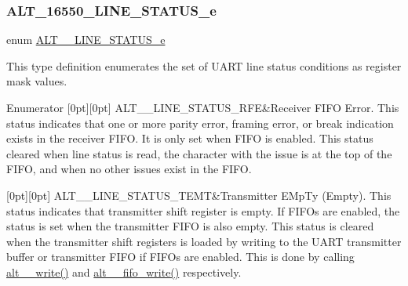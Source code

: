 \subsubsection{\texorpdfstring{ALT\_16550\_LINE\_STATUS\_e}{ALT\_16550\_LINE\_STATUS\_e}}
{\footnotesize\ttfamily enum \mbox{\hyperlink{group__UART__LINE_ga9bd71509496adb0f07549c10d42ff745}{A\+L\+T\+\_\+\_\+\+L\+I\+N\+E\+\_\+\+S\+T\+A\+T\+U\+S\+\_\+e}}}

This type definition enumerates the set of U\+A\+RT line status conditions as register mask values. \begin{DoxyEnumFields}{Enumerator}
[0pt][0pt]{}\mbox{\label{group__UART__LINE_gga9bd71509496adb0f07549c10d42ff745adf1a0232364a443d3e38a404ca891a95}} 
A\+L\+T\+\_\+\_\+\+L\+I\+N\+E\+\_\+\+S\+T\+A\+T\+U\+S\+\_\+\+R\+FE&Receiver F\+I\+FO Error. This status indicates that one or more parity error, framing error, or break indication exists in the receiver F\+I\+FO. It is only set when F\+I\+FO is enabled. This status cleared when line status is read, the character with the issue is at the top of the F\+I\+FO, and when no other issues exist in the F\+I\+FO. \\
\hline

[0pt][0pt]{}\mbox{\label{group__UART__LINE_gga9bd71509496adb0f07549c10d42ff745a93d8b3b386c04f6a0c1d3ae4fdfcb7d1}} 
A\+L\+T\+\_\+\_\+\+L\+I\+N\+E\+\_\+\+S\+T\+A\+T\+U\+S\+\_\+\+T\+E\+MT&Transmitter E\+Mp\+Ty (Empty). This status indicates that transmitter shift register is empty. If F\+I\+F\+Os are enabled, the status is set when the transmitter F\+I\+FO is also empty. This status is cleared when the transmitter shift registers is loaded by writing to the U\+A\+RT transmitter buffer or transmitter F\+I\+FO if F\+I\+F\+Os are enabled. This is done by calling \mbox{\hyperlink{group__UART__BASIC_gac16e07d06c432803c734854ab9789dcd}{alt\+\_\+\_\+write()}} and \mbox{\hyperlink{group__UART__FIFO_ga8d30fc6d9735e51d61c10a5ff86c416e}{alt\+\_\+\_\+fifo\+\_\+write()}} respectively. \\
\hline


\end{DoxyEnumFields}
